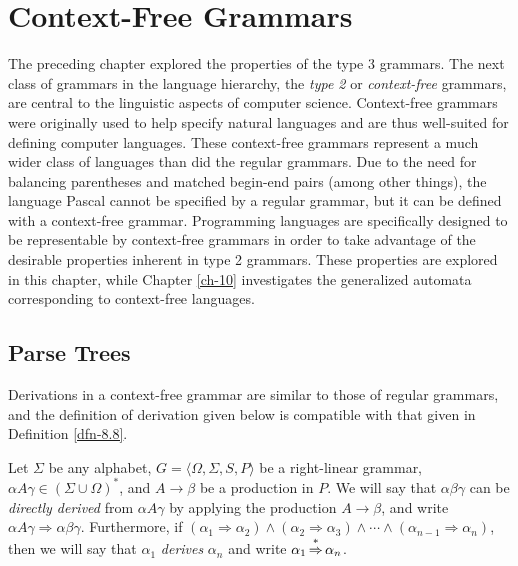 \chapter{Context-Free Grammars}\label{ch-9}

The preceding chapter explored the properties of the type 3 grammars. The next
class of grammars in the language hierarchy, the \emph{type 2} or
\emph{context-free} grammars, are central to the linguistic aspects of computer
science. Context-free grammars were originally used to help specify natural
languages and are thus well-suited for defining computer languages. These
context-free grammars represent a much wider class of languages than did the
regular grammars. Due to the need for balancing parentheses and matched
begin-end pairs (among other things), the language Pascal cannot be specified by
a regular grammar, but it can be defined with a context-free grammar.
Programming languages are specifically designed to be representable by
context-free grammars in order to take advantage of the desirable properties
inherent in type 2 grammars. These properties are explored in this chapter,
while Chapter \ref{ch-10} investigates the generalized automata corresponding to
context-free languages.

\section{Parse Trees}\label{sec-9.1}

Derivations in a context-free grammar are similar to those of regular grammars,
and the definition of derivation given below is compatible with that given in
Definition \ref{dfn-8.8}.

\begin{dfn}\label{dfn-9.1}
Let $\Sigma$ be any alphabet, $G=\langle\Omega,\Sigma,S,P\rangle$ be a
right-linear grammar, $\alpha A\gamma\in(\Sigma\cup\Omega)^*$, and $A\rightarrow
\beta$ be a production in $P$. We will say that $\alpha\beta\gamma$ can be
\emph{directly derived} from $\alpha A\gamma$ by applying the production $A
\rightarrow\beta$, and write $\alpha A\gamma\Rightarrow\alpha\beta\gamma$.
Furthermore, if $(\alpha_1\Rightarrow\alpha_2)\wedge(\alpha_2\Rightarrow\alpha_3)
\wedge\cdots\wedge(\alpha_{n-1}\Rightarrow\alpha_n)$, then we will say that
$\alpha_1$ \emph{derives} $\alpha_n$ and write $\alpha_1 \operatorname{\overset{*}{\Rightarrow}}\alpha_n$.
\end{dfn}

